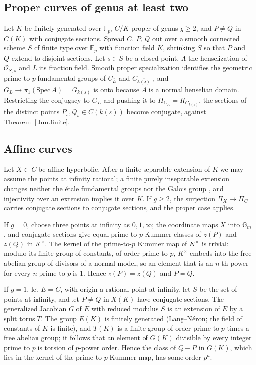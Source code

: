 \documentclass[11pt]{amsart}
\theoremstyle{remark}
\newcommand{\F}{\mathbb F}
\begin{document}
\subsection{Proper curves of genus at least two}
Let $K$ be finitely generated over $\F_p$, $C/K$ proper of genus $g\ge2$, and $P\ne Q$ in $C(K)$ with conjugate sections. Spread $C$, $P$, $Q$ out over a smooth connected scheme $S$ of finite type over $\F_p$ with function field $K$, shrinking $S$ so that $P$ and $Q$ extend to disjoint sections. Let $s\in S$ be a closed point, $A$ the henselization of $\mathcal O_{S,s}$ and $L$ its fraction field. Smooth proper specialization identifies the geometric prime-to-$p$ fundamental groups of $C_{\overline L}$ and $C_{\overline{k(s)}}$ \cite[X, Th\'eor\`eme 3.8, Corollaire 3.9]{SGA1}, and $G_L\to\pi_1(\mathrm{Spec}\,A)=G_{k(s)}$ is onto because $A$ is a normal henselian domain. Restricting the conjugacy to $G_L$ and pushing it to $\Pi_{C_A}=\Pi_{C_{k(s)}}$, the sections of the distinct points $P_s,Q_s\in C(k(s))$ become conjugate, against Theorem~\ref{thm:finite}.

\subsection{Affine curves}
Let $X\subset C$ be affine hyperbolic. After a finite separable extension of $K$ we may assume the points at infinity rational; a finite purely inseparable extension changes neither the \'etale fundamental groups nor the Galois group \cite[IX, Th\'eor\`eme 4.10]{SGA1}, and injectivity over an extension implies it over $K$. If $g\ge2$, the surjection $\Pi_X\to\Pi_C$ carries conjugate sections to conjugate sections, and the proper case applies.

If $g=0$, choose three points at infinity as $0,1,\infty$; the coordinate maps $X$ into $\mathbb G_m$, and conjugate sections give equal prime-to-$p$ Kummer classes of $z(P)$ and $z(Q)$ in $K^\times$. The kernel of the prime-to-$p$ Kummer map of $K^\times$ is trivial: modulo its finite group of constants, of order prime to $p$, $K^\times$ embeds into the free abelian group of divisors of a normal model, so an element that is an $n$-th power for every $n$ prime to $p$ is $1$. Hence $z(P)=z(Q)$ and $P=Q$.

If $g=1$, let $E=C$, with origin a rational point at infinity, let $S$ be the set of points at infinity, and let $P\ne Q$ in $X(K)$ have conjugate sections. The generalized Jacobian $G$ of $E$ with reduced modulus $S$ is an extension of $E$ by a split torus $T$. The group $E(K)$ is finitely generated (Lang--N\'eron; the field of constants of $K$ is finite), and $T(K)$ is a finite group of order prime to $p$ times a free abelian group; it follows that an element of $G(K)$ divisible by every integer prime to $p$ is torsion of $p$-power order. Hence the class of $Q-P$ in $G(K)$, which lies in the kernel of the prime-to-$p$ Kummer map, has some order $p^a$.
\end{document}
